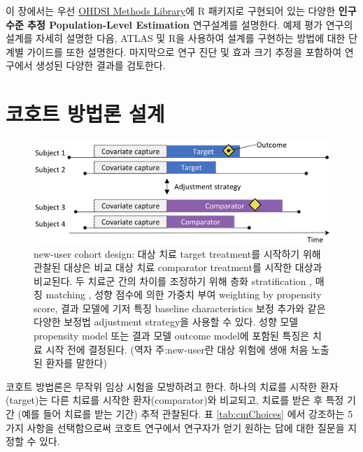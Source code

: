 \documentclass[11pt]{book}
\theoremstyle{definition}
\theoremstyle{definition}
\theoremstyle{definition}
\theoremstyle{remark}
\begin{document}
이 장에서는 우선 \href{https://ohdsi.github.io/MethodsLibrary/}{OHDSI
Methods Library}에 R 패키지로 구현되어 있는 다양한 \textbf{인구 수준
추정 Population-Level Estimation} 연구설계를 설명한다. 예제 평가 연구의
설계를 자세히 설명한 다음, ATLAS 및 R을 사용하여 설계를 구현하는 방법에
대한 단계별 가이드를 또한 설명한다. 마지막으로 연구 진단 및 효과 크기
추정을 포함하여 연구에서 생성된 다양한 결과를 검토한다.

\section{코호트 방법론 설계}\label{CohortMethod}


\begin{figure}

{\centering \includegraphics[width=0.9\linewidth]{images/PopulationLevelEstimation/cohortMethod} 

}

\caption{new-user cohort design: 대상 치료 target treatment를 시작하기 위해 관찰된 대상은 비교 대상 치료 comparator treatment를 시작한 대상과 비교된다. 두 치료군 간의 차이를 조정하기 위해 층화 stratification , 매칭 matching , 성향 점수에 의한 가중치 부여 weighting by propensity score, 결과 모델에 기저 특징 baseline characteristics 보정 추가와 같은 다양한 보정법 adjustment strategy을 사용할 수 있다. 성향 모델 propensity model 또는 결과 모델 outcome model에 포함된 특징은 치료 시작 전에 결정된다. (역자 주:new-user란 대상 위험에 생애 처음 노출된 환자를 말한다) }\label{fig:cohortMethod}
\end{figure}

코호트 방법론은 무작위 임상 시험을 모방하려고 한다. \citep{hernan_2016}
하나의 치료를 시작한 환자(target)는 다른 치료를 시작한
환자(comparator)와 비교되고, 치료를 받은 후 특정 기간 (예를 들어 치료를
받는 기간) 추적 관찰된다. 표 \ref{tab:cmChoices} 에서 강조하는 5가지
사항을 선택함으로써 코호트 연구에서 연구자가 얻기 원하는 답에 대한
질문을 지정할 수 있다. 
 
\end{document}
